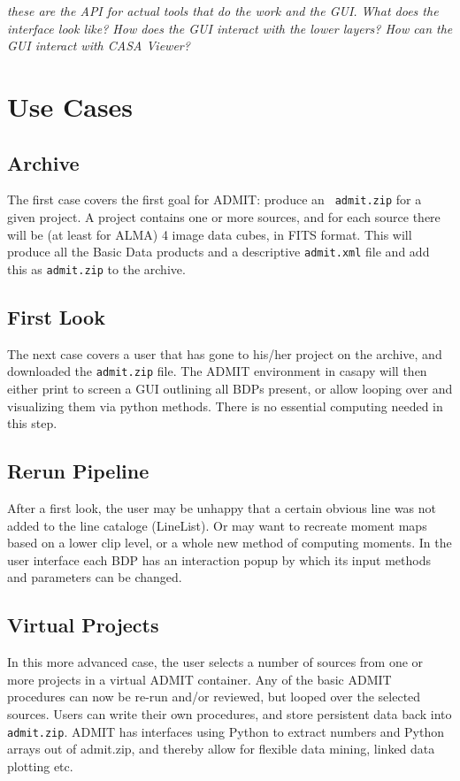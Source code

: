 \documentclass{report}
\begin{document}
{\it these are the API for actual tools that do the
work and the GUI. What does the interface look like?
How does the GUI interact with the lower layers? How
can the GUI interact with CASA Viewer?}

\section{Use Cases}

\subsection{Archive}

The first case covers the first goal for ADMIT: produce an {\tt
  admit.zip} for a given project.  A project contains one or more
sources, and for each source there will be (at least for ALMA) 4 image
data cubes, in FITS format. This will produce all the Basic Data
products and a descriptive {\tt admit.xml} file and add this as 
{\tt admit.zip} to the archive.



\subsection{First Look}

The next case covers a user that has gone to his/her project on the archive,
and downloaded the {\tt admit.zip} file. The ADMIT environment in casapy
will then either print to screen a GUI outlining all BDPs present, or
allow looping over and visualizing them via python methods. There is no
essential computing needed in this step.

\subsection{Rerun Pipeline}

After a first look, the user may be unhappy that a certain obvious line
was not added to the line cataloge (LineList). Or may want to recreate
moment maps based on a lower clip level, or a whole new method of
computing moments. In the user interface each BDP has an
interaction popup by which its input methods and parameters can be changed.

\subsection{Virtual Projects}

In this more advanced case, the user selects a number of sources from one
or more projects in a virtual ADMIT container. Any of the basic ADMIT procedures
can now be re-run and/or reviewed, but looped over the selected sources.
Users can write their own procedures,
and store persistent data back into {\tt admit.zip}. ADMIT has interfaces
using Python to extract numbers and Python arrays out of admit.zip, and thereby
allow for flexible data mining, linked data plotting etc.
\end{document}

